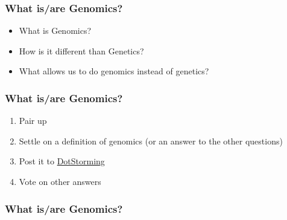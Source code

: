 \documentclass[14pt]{beamer}
\begin{document}
\begin{frame}
\frametitle{What is/are Genomics?}
\begin{itemize}
	\item What is Genomics?
	\item How is it different than Genetics?
	\item What allows us to do genomics instead of genetics?
\end{itemize}
\end{frame}

\begin{frame}
\frametitle{What is/are Genomics?}
	\begin{enumerate}
		\item<+-> Pair up
		\item<+-> Settle on a definition of genomics (or an answer to the other questions)
		\item<+-> Post it to \href{https://dotstorming.com/b/59ae934397b729fa05814972}{DotStorming}
		\item<+-> Vote on other answers
	\end{enumerate}
\end{frame}

\begin{frame}
\frametitle{What is/are Genomics?}



\end{frame}
\end{document}
